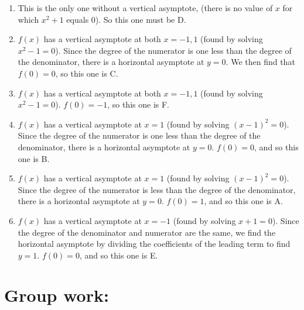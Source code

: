 \documentclass[nooutcomes]{ximera}
\begin{document}
	
		\begin{freeResponse} 
			\begin{enumerate}[label=\arabic*.]  
			\item  This is the only one without a vertical asymptote, (there is no value of $x$ for which $x^2 + 1$ equals 0).  So this one must be D.
			
			\item  $f(x)$ has a vertical asymptote at both $x=-1,1$ (found by solving $x^2 - 1 = 0$).  Since the degree of the numerator is one less than the degree of the denominator, there is a horizontal asymptote at $y=0$.  We then find that $f(0)=0$, so this one is C.
			
			\item  $f(x)$ has a vertical asymptote at both $x=-1,1$ (found by solving $x^2 - 1 = 0$).  $f(0) = -1$, so this one is F.  
			
			\item  $f(x)$ has a vertical asymptote at $x=1$ (found by solving $(x-1)^2 = 0$).  Since the degree of the numerator is one less than the degree of the denominator, there is a horizontal asymptote at $y=0$.  $f(0)=0$, and so this one is B.
			
			\item  $f(x)$ has a vertical asymptote at $x=1$ (found by solving $(x-1)^2 = 0$).  Since the degree of the numerator is less than the degree of the denominator, there is a horizontal asymptote at $y=0$.  $f(0)=1$, and so this one is A.
			
			\item  $f(x)$ has a vertical asymptote at $x=-1$ (found by solving $x+1=0$).  Since the degree of the denominator and numerator are the same, we find the horizontal asymptote by dividing the coefficients of the leading term to find $y=1$.   $f(0)=0$, and so this one is E.
	\end{enumerate}
		\end{freeResponse}
	
	
	
	



\section*{Group work:}
\end{document}

